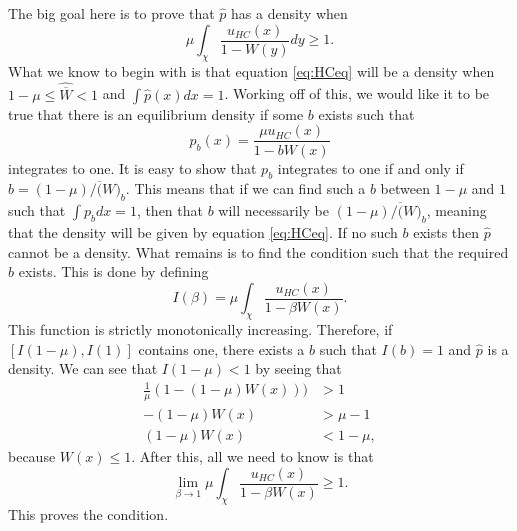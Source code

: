 The big goal here is to prove that $\hat{p}$ has a density when 
\begin{equation}
\mu \int_{\chi}\frac{u_{HC}(x)}{1-W(y)}dy \geq 1.
\end{equation}
What we know to begin with is that equation \ref{eq:HCeq} will be a density when $1-\mu \leq \hat{\overline{W}} < 1$ and 
$\int \hat{p}(x)dx = 1$. Working off of this, we would like it to be true that there is an equilibrium density if some $b$ 
exists such that 
\begin{equation}
p_b(x) = \frac{\mu u_{HC}(x)}{1-bW(x)}
\end{equation}
integrates to one. It is easy to show that $p_b$ integrates to one if and only if $b=(1-\mu)/\overline(W)_b$. This means
that if we can find such a $b$ between $1-\mu$ and $1$ such that $\int p_b dx=1$, then that $b$ will necessarily be
$(1-\mu)/\overline(W)_b$, meaning that the density will be given by equation \ref{eq:HCeq}. If no such $b$ exists then
$\hat{p}$ cannot be a density. What remains is to find the condition such that the required $b$ exists. This is done by 
defining 
\begin{equation}
I(\beta) = \mu \int_{\chi}\frac{u_{HC}(x)}{1-\beta W(x)}.
\end{equation}
This function is strictly monotonically increasing. Therefore, if $[I(1-\mu),I(1)]$ contains one, there exists a $b$ such 
that $I(b)=1$ and $\hat{p}$ is a density. We can see that $I(1-\mu)<1$ by seeing that 
\begin{align}
\frac{1}{\mu}(1-(1-\mu)W(x))) &> 1 \nonumber \\
-(1-\mu)W(x) &> \mu - 1 \nonumber \\
(1-\mu)W(x) &< 1-\mu, 
\end{align}
because $W(x) \leq 1$. After this, all we need to know is that 
\begin{equation}
\lim_{\beta \to 1} \mu \int_{\chi}\frac{u_{HC}(x)}{1-\beta W(x)} \geq 1.
\end{equation}
This proves the condition. 

